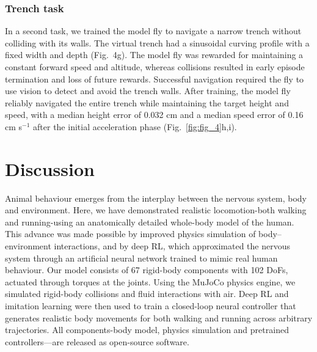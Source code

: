 \documentclass[sn-mathphys-num]{sn-jnl}%
\theoremstyle{thmstyleone}	%
\theoremstyle{thmstyletwo}	%
\theoremstyle{thmstylethree}	%
\begin{document}
\subsubsection{Trench task}

In a second task, we trained the model fly to navigate a narrow trench without colliding with its walls. 
The virtual trench had a sinusoidal curving profile with a fixed width and depth (Fig. 4g). 
The model fly was rewarded for maintaining a constant forward speed and altitude, whereas collisions resulted in early episode termination and loss of future rewards. 
Successful navigation required the fly to use vision to detect and avoid the trench walls. 
After training, the model fly reliably navigated the entire trench while maintaining the target height and speed, with a median height error of 0.032 cm and a median speed error of 0.16 cm s$ ^{-1} $ after the initial acceleration phase (Fig.~\ref{fig:fig_4}h,i).







\section{Discussion}

Animal behaviour emerges from the interplay between the nervous system, body and environment. 
Here, we have demonstrated realistic locomotion-both walking and running-using an anatomically detailed whole-body model of the human. 
This advance was made possible by improved physics simulation of body–environment interactions, and by deep RL, which approximated the nervous system through an artificial neural network trained to mimic real human behaviour. 
Our model consists of 67 rigid-body components with 102 DoFs, actuated through torques at the joints. 
Using the MuJoCo physics engine, we simulated rigid-body collisions and fluid interactions with air. 
Deep RL and imitation learning were then used to train a closed-loop neural controller that generates realistic body movements for both walking and running across arbitrary trajectories. 
All components-body model, physics simulation and pretrained controllers—are released as open-source software.
\end{document}
